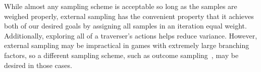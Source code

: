 \documentclass{article}
\newcommand{\adam}[1]{\textbf{\textcolor{magenta}{#1}}}
\begin{document}




While almost any sampling scheme is acceptable so long as the samples are weighed properly, external sampling has the convenient property that it achieves both of our desired goals by assigning all samples in an iteration equal weight. Additionally, exploring all of a traverser's actions helps reduce variance. However, external sampling may be impractical in games with extremely large branching factors, so a different sampling scheme, such as outcome sampling~\cite{Lanctot09:Monte}, may be desired in those cases.
\end{document}
